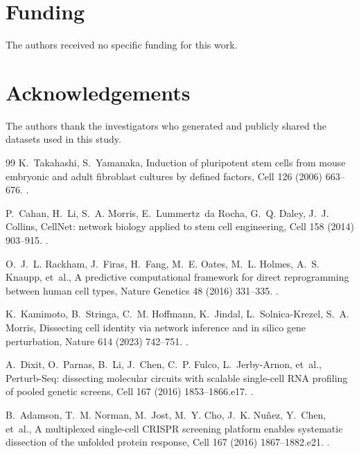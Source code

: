 \documentclass[a4paper,fleqn]{cas-sc}
\begin{document}
\section*{Funding}
The authors received no specific funding for this work.

\printcredits

\section*{Acknowledgements}
The authors thank the investigators who generated and publicly shared the datasets used in this study.

\begingroup
\color{black}
\hypersetup{citecolor=black,linkcolor=black,urlcolor=black}
\begin{thebibliography}{99}
K.~Takahashi, S.~Yamanaka, Induction of pluripotent stem cells from mouse embryonic and adult fibroblast cultures by defined factors, Cell 126 (2006) 663--676.
\newblock \href {https://doi.org/10.1016/j.cell.2006.07.024} {}.

P.~Cahan, H.~Li, S.~A. Morris, E.~Lummertz~da Rocha, G.~Q. Daley, J.~J. Collins, {CellNet}: network biology applied to stem cell engineering, Cell 158 (2014) 903--915.
\newblock \href {https://doi.org/10.1016/j.cell.2014.07.020} {}.

O.~J.~L. Rackham, J.~Firas, H.~Fang, M.~E. Oates, M.~L. Holmes, A.~S. Knaupp, et~al., A predictive computational framework for direct reprogramming between human cell types, Nature Genetics 48 (2016) 331--335.
\newblock \href {https://doi.org/10.1038/ng.3487} {}.

K.~Kamimoto, B.~Stringa, C.~M. Hoffmann, K.~Jindal, L.~Solnica-Krezel, S.~A. Morris, Dissecting cell identity via network inference and in silico gene perturbation, Nature 614 (2023) 742--751.
\newblock \href {https://doi.org/10.1038/s41586-022-05688-9} {}.

A.~Dixit, O.~Parnas, B.~Li, J.~Chen, C.~P. Fulco, L.~Jerby-Arnon, et~al., {Perturb-Seq}: dissecting molecular circuits with scalable single-cell {RNA} profiling of pooled genetic screens, Cell 167 (2016) 1853--1866.e17.
\newblock \href {https://doi.org/10.1016/j.cell.2016.11.038} {}.

B.~Adamson, T.~M. Norman, M.~Jost, M.~Y. Cho, J.~K. Nu{\~n}ez, Y.~Chen, et~al., A multiplexed single-cell {CRISPR} screening platform enables systematic dissection of the unfolded protein response, Cell 167 (2016) 1867--1882.e21.
\newblock \href {https://doi.org/10.1016/j.cell.2016.11.048} {}.


\end{thebibliography}
\end{document}

